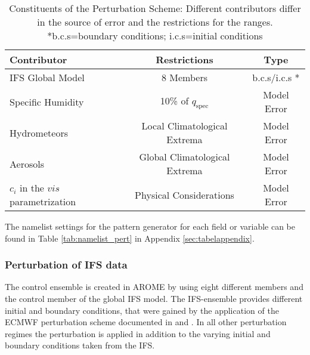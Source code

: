 \begin{table}[h]
\captionsetup{justification=justified}

    \footnotesize
    \centering
        \begin{tabular}{|l|c|c|}
        \hline
        \textbf{Contributor}&\textbf{Restrictions}&\textbf{Type}  \\
        \hline
        \hline
        IFS Global Model&8 Members& b.c.s/i.c.s *\\
        \hline
        Specific Humidity & 10\% of $q_{\mathrm{spec}}$&Model Error\\
        \hline
        Hydrometeors&Local Climatological Extrema&Model Error \\
        \hline
        Aerosols&Global Climatological Extrema&Model Error \\
        \hline
        $c_{i}$ in the $vis$ parametrization&Physical Considerations&Model Error\\
        \hline
    \end{tabular}
    \caption{\footnotesize{Constituents of the Perturbation Scheme: Different contributors differ in the source of error and the restrictions for the ranges.\\ \tiny{*b.c.s=boundary conditions; i.c.s=initial conditions} }}
    \label{tab:ensem}
\end{table}
The namelist settings for the pattern generator for each field or variable can be found in Table \ref{tab:namelist_pert} in Appendix \ref{sec:tabelappendix}.


\subsubsection{Perturbation of IFS data}
The control ensemble is created in AROME by using eight different members and the control member of the global IFS model. The IFS-ensemble provides different initial and boundary conditions, that were gained by the application of the ECMWF perturbation scheme documented in \cite{documentationpart} and \cite{IFS}. In all other perturbation regimes the perturbation is applied in addition to the varying  initial and boundary conditions taken from the IFS.


